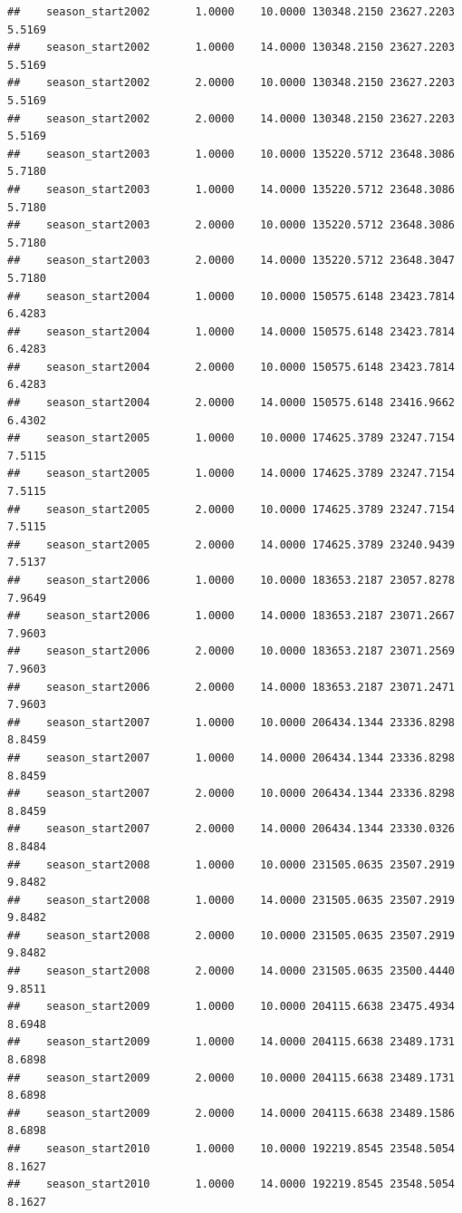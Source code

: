 \documentclass[
]{book}
\begin{document}
\begin{verbatim}
##    season_start2002       1.0000    10.0000 130348.2150 23627.2203  5.5169
##    season_start2002       1.0000    14.0000 130348.2150 23627.2203  5.5169
##    season_start2002       2.0000    10.0000 130348.2150 23627.2203  5.5169
##    season_start2002       2.0000    14.0000 130348.2150 23627.2203  5.5169
##    season_start2003       1.0000    10.0000 135220.5712 23648.3086  5.7180
##    season_start2003       1.0000    14.0000 135220.5712 23648.3086  5.7180
##    season_start2003       2.0000    10.0000 135220.5712 23648.3086  5.7180
##    season_start2003       2.0000    14.0000 135220.5712 23648.3047  5.7180
##    season_start2004       1.0000    10.0000 150575.6148 23423.7814  6.4283
##    season_start2004       1.0000    14.0000 150575.6148 23423.7814  6.4283
##    season_start2004       2.0000    10.0000 150575.6148 23423.7814  6.4283
##    season_start2004       2.0000    14.0000 150575.6148 23416.9662  6.4302
##    season_start2005       1.0000    10.0000 174625.3789 23247.7154  7.5115
##    season_start2005       1.0000    14.0000 174625.3789 23247.7154  7.5115
##    season_start2005       2.0000    10.0000 174625.3789 23247.7154  7.5115
##    season_start2005       2.0000    14.0000 174625.3789 23240.9439  7.5137
##    season_start2006       1.0000    10.0000 183653.2187 23057.8278  7.9649
##    season_start2006       1.0000    14.0000 183653.2187 23071.2667  7.9603
##    season_start2006       2.0000    10.0000 183653.2187 23071.2569  7.9603
##    season_start2006       2.0000    14.0000 183653.2187 23071.2471  7.9603
##    season_start2007       1.0000    10.0000 206434.1344 23336.8298  8.8459
##    season_start2007       1.0000    14.0000 206434.1344 23336.8298  8.8459
##    season_start2007       2.0000    10.0000 206434.1344 23336.8298  8.8459
##    season_start2007       2.0000    14.0000 206434.1344 23330.0326  8.8484
##    season_start2008       1.0000    10.0000 231505.0635 23507.2919  9.8482
##    season_start2008       1.0000    14.0000 231505.0635 23507.2919  9.8482
##    season_start2008       2.0000    10.0000 231505.0635 23507.2919  9.8482
##    season_start2008       2.0000    14.0000 231505.0635 23500.4440  9.8511
##    season_start2009       1.0000    10.0000 204115.6638 23475.4934  8.6948
##    season_start2009       1.0000    14.0000 204115.6638 23489.1731  8.6898
##    season_start2009       2.0000    10.0000 204115.6638 23489.1731  8.6898
##    season_start2009       2.0000    14.0000 204115.6638 23489.1586  8.6898
##    season_start2010       1.0000    10.0000 192219.8545 23548.5054  8.1627
##    season_start2010       1.0000    14.0000 192219.8545 23548.5054  8.1627

\end{verbatim}
\end{document}
